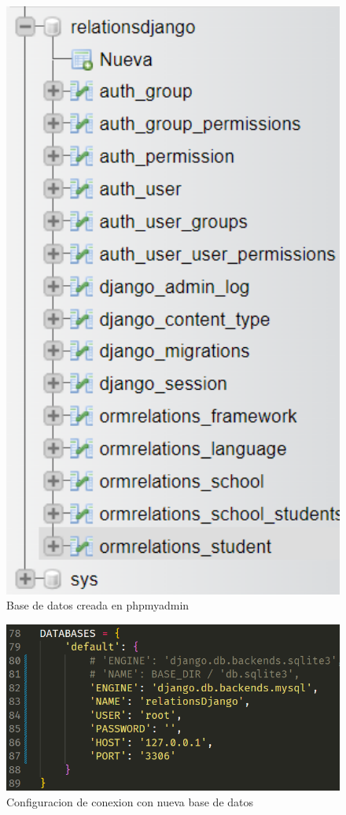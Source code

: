\documentclass{article}
\begin{document}
        \begin{figure}
            \centering
            \includegraphics[width=150mm]{img/img5.png}
            \caption{Base de datos creada en phpmyadmin}
            \label{fig:enter-label}
        \end{figure}
        \begin{figure}
            \centering
            \includegraphics[width=150mm]{img/img6.png}
            \caption{Configuracion de conexion con nueva base de datos}
            \label{fig:enter-label}
        \end{figure}
\end{document}
